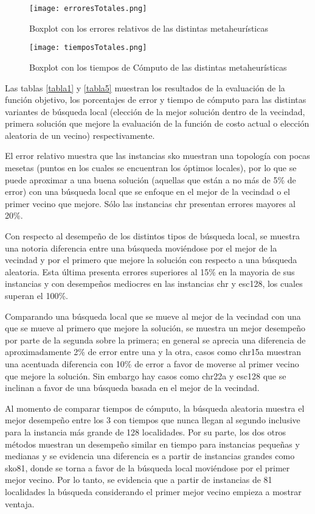 \documentclass{ci5652}
\begin{document}
\begin{figure*}[p]
\caption{Boxplot con los errores relativos de las distintas metaheurísticas}
\texttt{[image: erroresTotales.png]}    
\label{fig1}
\end{figure*}

\begin{figure*}[p]
\caption{Boxplot con los tiempos de Cómputo de las distintas metaheurísticas}
\texttt{[image: tiemposTotales.png]}    
\label{fig2}
\end{figure*}

Las tablas \ref{tabla1} y \ref{tabla5} muestran los resultados de la evaluación de la función objetivo, los porcentajes de error y tiempo de cómputo para las distintas variantes de búsqueda local (elección de la mejor solución dentro de la vecindad, primera solución que mejore la evaluación de la función de costo actual o elección aleatoria de un vecino) respectivamente.

El error relativo muestra que las instancias sko muestran una topología con pocas mesetas (puntos en los cuales se encuentran los óptimos locales), por lo que se puede aproximar a una buena solución (aquellas que están a no más de 5\% de error) con una búsqueda local que se enfoque en el mejor de la vecindad o el primer vecino que mejore. Sólo las instancias chr presentan errores mayores al 20\%.

Con respecto al desempeño de los distintos tipos de búsqueda local, se muestra una notoria diferencia entre una búsqueda moviéndose por el mejor de la vecindad y por el primero que mejore la solución con respecto a una búsqueda aleatoria. Esta última presenta errores superiores al 15\% en la mayoria de sus instancias y con desempeños mediocres en las instancias chr y esc128, los cuales superan el 100\%.

Comparando una búsqueda local que se mueve al mejor de la vecindad con una que se mueve al primero que mejore la solución, se muestra un mejor desempeño por parte de la segunda sobre la primera; en general se aprecia una diferencia de aproximadamente 2\% de error entre una y la otra, casos como chr15a muestran una acentuada diferencia con 10\% de error a favor de moverse al primer vecino que mejore la solución. Sin embargo hay casos como chr22a y esc128 que se inclinan a favor de una búsqueda basada en el mejor de la vecindad.

Al momento de comparar tiempos de cómputo, la búsqueda aleatoria muestra el mejor desempeño entre los 3 con tiempos que nunca llegan al segundo inclusive para la instancia más grande de 128 localidades. Por su parte, los dos otros métodos muestran un desempeño similar en tiempo para instancias pequeñas y medianas y se evidencia una diferencia es a partir de instancias grandes como sko81, donde se torna a favor de la búsqueda local moviéndose por el primer mejor vecino. Por lo tanto, se evidencia que a partir de instancias de 81 localidades la búsqueda considerando el primer mejor vecino empieza a mostrar ventaja.
\end{document}
